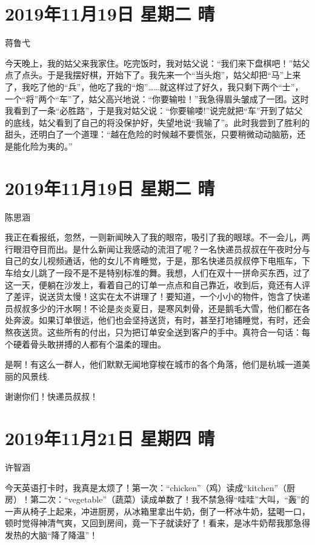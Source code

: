 \section{2019年11月19日 星期二 晴}

蒋鲁弋

今天晚上，我的姑父来我家住。吃完饭时，我对姑父说：``我们来下盘棋吧！''姑父点了点头。于是我摆好棋，开始下了。我先来一个``当头炮''，姑父却把``马''上来了，我吃了他的``兵''，他吃了我的``炮''\ldots\ldots 就这样过了好久，我只剩下两个``士''，一个``将''两个``车''了，姑父高兴地说：``你要输啦！''我急得眉头皱成了一团。这时我看到了一条``必胜路''，于是我对姑父说：``你要输喽!''说完就把``车''开到了姑父的底线，姑父看到了自己的将没保护好，失望地说``我输了''。此时我尝到了胜利的甜头，还明白了一个道理：``越在危险的时候越不要慌张，只要稍微动动脑筋，还是能化险为夷的。''

\section{2019年11月19日 星期二 晴}

陈思涵

我正在看报纸，忽然，一则新闻映入了我的眼帘，吸引了我的眼球。不一会儿，两行眼泪夺目而出。是什么新闻让我感动的流泪了呢？一名快递员叔叔在午夜时分与自己的女儿视频通话，他的女儿不肯睡觉，于是，那名快递员叔叔停下电瓶车，下车给女儿跳了一段不是不是特别标准的舞。我想，人们在双十一拼命买东西，过了这一天，便躺在沙发上，看着自己的订单一点点和自己靠近，收到后，竟还有人评了差评，说送货太慢！这实在太不讲理了！要知道，一个小小的物件，饱含了快递员叔叔多少的汗水啊！不论是炎炎夏日，是寒风刺骨，还是鹅毛大雪，他们都在各处奔波。如果订单很远，他们也会坚持送货，有时，甚至打地铺睡觉，有时，还会熬夜送货。这些所有的付出，只为把订单安全送到客户的手中。真符合一句话：每个硬着骨头敢拼搏的人都有个温柔的理由。

是啊！有这么一群人，他们默默无闻地穿梭在城市的各个角落，他们是杭城一道美丽的风景线.

谢谢你们！快递员叔叔！

\section{2019年11月21日 星期四 晴}

许智涵

今天英语打卡时，我真是太烦了！第一次：``chicken''（鸡）读成``kitchen''（厨房）！第二次：``vegetable''（蔬菜）读成单数了！我不禁急得``哇哇''大叫，``轰''的一声从椅子上起来，冲进厨房，从冰箱里拿出牛奶，倒了一杯冰牛奶，猛喝一口，顿时觉得神清气爽，又回到房间，竟一下子就读好了！看来，是冰牛奶帮我那急得发热的大脑``降了降温''！

